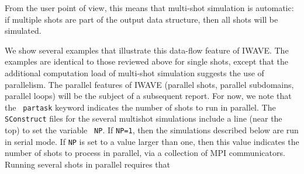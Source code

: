 From the user point of view, this means that multi-shot simulation is
automatic: if multiple shots are part of the output data structure,
then all shots will be simulated.

We show several examples that illustrate this data-flow feature of
IWAVE. The examples are identical to those reviewed above for single
shots, except that the additional computation load of multi-shot
simulation suggests the use of parallelism. The parallel features of
IWAVE (parallel shots, parallel subdomains, parallel loops) will be
the subject of a subsequent report. For now, we note that the {\tt
  partask} keyword indicates the number of shots to run in
parallel. The {\tt SConstruct} files for the several multishot
simulations include a line (near the top) to set the variable {\tt
  NP}. If {\tt NP=1}, then the simulations described below are run in
serial  mode. If {\tt NP} is set to a value larger than one, then this value
indicates the number of shots to process in parallel, via a collection
of MPI communicators. Running several shots in parallel requires that
